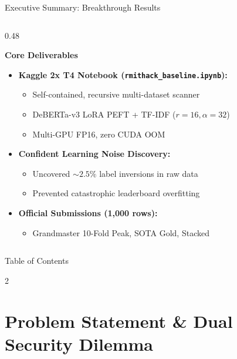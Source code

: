 \documentclass[aspectratio=169]{beamer}
\begin{document}
\begin{frame}{Executive Summary: Breakthrough Results}
\begin{columns}[T]
\begin{column}{0.48\textwidth}
\begin{block}{\textbf{Core Deliverables}}
\fontsize{6.5pt}{7.5pt}\selectfont
\begin{itemize}\setlength{\itemsep}{0pt}
    \item \textbf{Kaggle 2x T4 Notebook (\texttt{rmithack\_baseline.ipynb}):}
    \begin{itemize}\setlength{\itemsep}{0pt}
        \item Self-contained, recursive multi-dataset scanner
        \item DeBERTa-v3 LoRA PEFT + TF-IDF ($r=16, \alpha=32$)
        \item Multi-GPU FP16, zero CUDA OOM
    \end{itemize}
    \item \textbf{Confident Learning Noise Discovery:}
    \begin{itemize}\setlength{\itemsep}{0pt}
        \item Uncovered $\sim 2.5\%$ label inversions in raw data
        \item Prevented catastrophic leaderboard overfitting
    \end{itemize}
    \item \textbf{Official Submissions (1,000 rows):}
    \begin{itemize}\setlength{\itemsep}{0pt}
        \item Grandmaster 10-Fold Peak, SOTA Gold, Stacked
    \end{itemize}
\end{itemize}
\end{block}
\end{column}
\end{columns}
\end{frame}



\begin{frame}{Table of Contents}
\begin{multicols}{2}
\tableofcontents
\end{multicols}
\end{frame}

\section{Problem Statement \& Dual Security Dilemma}
\end{document}
